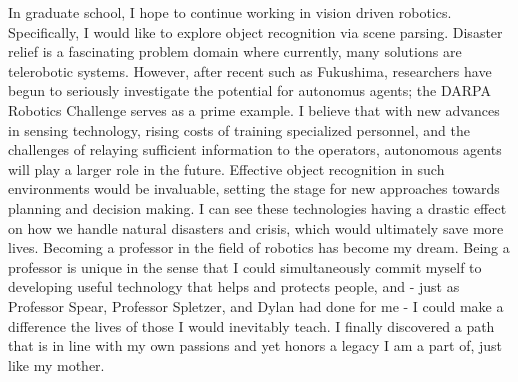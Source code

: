 \documentclass{article}
\begin{document}
In graduate school, I hope to continue working in vision driven robotics.
Specifically, I would like to explore object recognition via scene parsing.
Disaster relief is a fascinating problem domain where currently, many solutions
are telerobotic systems. However, after recent such as Fukushima, researchers
have begun to seriously investigate the potential for autonomus agents; the
DARPA Robotics Challenge serves as a prime example. I believe that with new
advances in sensing technology, rising costs of training specialized personnel,
and the challenges of relaying sufficient information to the operators,
autonomous agents will play a larger role in the future. Effective object
recognition in such environments would be invaluable, setting the stage for new
approaches towards planning and decision making. I can see these technologies
having a drastic effect on how we handle natural disasters and crisis, which
would ultimately save more lives. Becoming a professor in the field of robotics
has become my dream. Being a professor is unique in the sense that I could
simultaneously commit myself to developing useful technology that helps and
protects people, and - just as Professor Spear, Professor Spletzer, and Dylan
had done for me - I could make a difference the lives of those I would
inevitably teach. I finally discovered a path that is in line with my own
passions and yet honors a legacy I am a part of, just like my mother.
\end{document}
